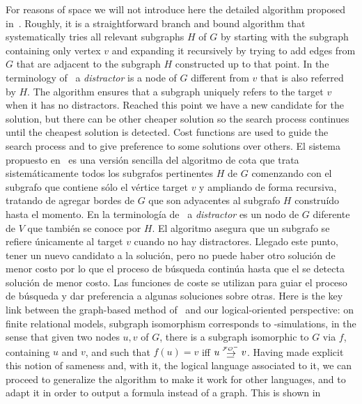 {For reasons of space we will not introduce here the detailed algorithm proposed
in~\cite{Krahmer2003}. Roughly, it is a
straightforward branch and bound algorithm that systematically tries all
relevant subgraphs $H$ of $G$ by starting with the subgraph
containing only vertex $v$ and expanding it recursively by trying to
add edges from $G$ that are adjacent to the subgraph $H$ constructed
up to that point. In the terminology
of~\cite{Krahmer2003} a {\em distractor} is a node of $G$ different from
$v$ that is also referred by $H$.
The algorithm ensures that a subgraph uniquely refers to the
target $v$ when it has no distractors. Reached this point we
have a new candidate for the solution, but there can be other
cheaper solution so the search process continues until the
cheapest solution is detected. Cost functions are used to
guide the search process and to give preference to some solutions
over others.
%
El sistema propuesto en~\cite{Krahmer2003} es una
versi\'on sencilla del algoritmo de cota que trata sistem\'aticamente todos los
subgrafos pertinentes $H$ de $G$ comenzando con el subgrafo
que contiene s\'olo el v\'ertice target $v$ y ampliando de forma recursiva, tratando de
agregar bordes de $G$ que son adyacentes al subgrafo $H$ constru\'ido
hasta el momento. En la terminolog\'ia de~\cite{Krahmer2003} a {\em distractor} es un nodo de $G$ diferente de
$V$ que tambi\'en se conoce por $H$.
El algoritmo asegura que un subgrafo se refiere \'unicamente al target $v$ cuando no hay distractores. Llegado este punto,
tener un nuevo candidato a la soluci\'on, pero no puede haber otro
soluci\'on de menor costo por lo que el proceso de b\'usqueda contin\'ua hasta que el
se detecta soluci\'on de menor costo. Las funciones de coste se utilizan para
guiar el proceso de b\'usqueda y dar preferencia a algunas soluciones
sobre otras.
Here is the key link between the graph-based method
of~\cite{Krahmer2003} and our logical-oriented perspective: on
finite relational models, subgraph isomorphism corresponds to
\EPFOL-simulations, in the sense that given two nodes $u,v$ of
$G$, there is a subgraph isomorphic to $G$ via $f$, containing $u$ and
$v$, and such that $f(u)=v$ iff $u \simul{\+\EPFOL} v$.
%
Having made explicit this notion of sameness and, with it, the
logical language associated to it, we can proceed to generalize the
algorithm to make it work for other languages, and to adapt it in
order to output a formula instead of a graph. This is shown in


}
